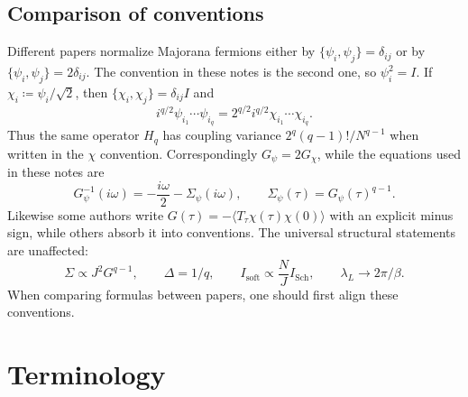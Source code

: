 \documentclass[11pt]{article}
\numberwithin{equation}{section}
\theoremstyle{exposition}
\theoremstyle{result}
\newcommand{\Sch}{\mathrm{Sch}}
\begin{document}
\subsection{Comparison of conventions}

Different papers normalize Majorana fermions either by $\{\psi_i,\psi_j\}=\delta_{ij}$ or by $\{\psi_i,\psi_j\}=2\delta_{ij}$. The convention in these notes is the second one, so $\psi_i^2=I$. If $\chi_i\coloneqq \psi_i/\sqrt2$, then $\{\chi_i,\chi_j\}=\delta_{ij}I$ and
\begin{equation*}
i^{q/2}\psi_{i_1}\cdots\psi_{i_q}
=2^{q/2}i^{q/2}\chi_{i_1}\cdots\chi_{i_q}.
\end{equation*}
Thus the same operator $H_q$ has coupling variance $2^q(q-1)!/N^{q-1}$ when written in the $\chi$ convention. Correspondingly $G_\psi=2G_\chi$, while the equations used in these notes are
\begin{equation*}
G_\psi^{-1}(i\omega)=-\frac{i\omega}{2}-\Sigma_\psi(i\omega),
\qquad
\Sigma_\psi(\tau)=G_\psi(\tau)^{q-1}.
\end{equation*}
Likewise some authors write $G(\tau)=-\langle T_\tau\chi(\tau)\chi(0)\rangle$ with an explicit minus sign, while others absorb it into conventions. The universal structural statements are unaffected:
\begin{equation*}
\Sigma\propto J^2G^{q-1},
\qquad
\Delta=1/q,
\qquad
I_{\mathrm{soft}}\propto \frac NJ I_{\Sch},
\qquad
\lambda_L\to 2\pi/\beta.
\end{equation*}
When comparing formulas between papers, one should first align these conventions.

\clearpage
\section{Terminology}
\end{document}
